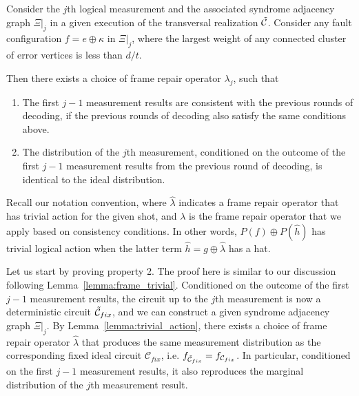 \begin{lemma}
\label{lemma:logical_error_weight}

Consider the $j$th logical measurement and the associated syndrome adjacency graph $\Xi|_j$ in a given execution of the transversal realization $\tilde{\mathcal{C}}$.
%
Consider any fault configuration $f=e\oplus \kappa$ in $\Xi|_j$, where the largest weight of any connected cluster of error vertices is less than $d/t$.

Then there exists a choice of frame repair operator $\lambda_j$, such that
\begin{enumerate}
\item The first $j-1$ measurement results are consistent with the previous rounds of decoding, if the previous rounds of decoding also satisfy the same conditions above.
\item The distribution of the $j$th measurement, conditioned on the outcome of the first $j-1$ measurement results from the previous round of decoding, is identical to the ideal distribution.
\end{enumerate}
\end{lemma}

Recall our notation convention, where $\hat{\lambda}$ indicates a frame repair operator that has trivial action for the given shot, and $\lambda$ is the frame repair operator that we apply based on consistency conditions.
%
In other words, \mbox{$P(f)\oplus P(\hat{h})$} has trivial logical action when the latter term $\hat{h}=g\oplus\hat{\lambda}$ has a hat.

Let us start by proving property 2.
%
The proof here is similar to our discussion following Lemma~\ref{lemma:frame_trivial}.
%
Conditioned on the outcome of the first $j-1$ measurement results, the circuit up to the $j$th measurement is now a deterministic circuit $\tilde{\mathcal{C}}_{fix}$, and we can construct a given syndrome adjacency graph $\Xi|_j$.
%
By Lemma~\ref{lemma:trivial_action}, there exists a choice of frame repair operator $\hat{\lambda}$ that produces the same measurement distribution as the corresponding fixed ideal circuit $\mathcal{C}_{fix}$, i.e. $f_{\tilde{\mathcal{C}}_{fix}}=f_{\mathcal{C}_{fix}}$.
%
In particular, conditioned on the first $j-1$ measurement results, it also reproduces the marginal distribution of the $j$th measurement result.

